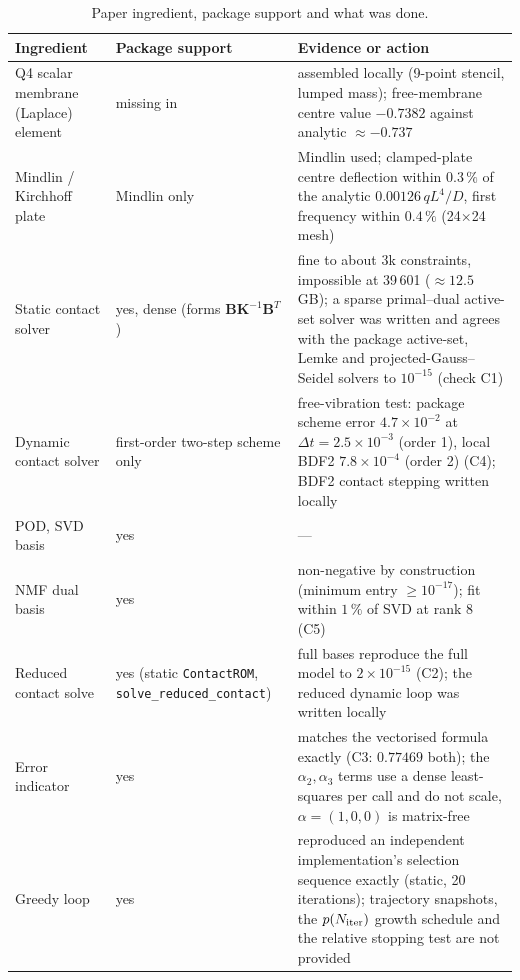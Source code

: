 \begin{table}[tbp]
\centering\footnotesize
\caption{Paper ingredient, package support and what was done.}\label{tab:vf-bl-cap}
\begin{tabularx}{\linewidth}{@{}>{\raggedright\arraybackslash}p{3.3cm} >{\raggedright\arraybackslash}p{3.2cm} >{\raggedright\arraybackslash}X@{}}
\toprule
Ingredient & Package support & Evidence or action\\
\midrule
Q4 scalar membrane (Laplace) element & missing in \fea{} & assembled locally (9-point stencil, lumped mass); free-membrane centre value $-0.7382$ against analytic $\approx-0.737$\\
Mindlin / Kirchhoff plate & Mindlin only & Mindlin used; clamped-plate centre deflection within $0.3\,\%$ of the analytic $0.00126\,qL^4/D$, first frequency within $0.4\,\%$ (24$\times$24 mesh)\\
Static contact solver & yes, dense (forms $\mathbf B\mathbf K^{-1}\mathbf B^{T}$) & fine to about 3k constraints, impossible at 39\,601 ($\approx12.5$ GB); a sparse primal--dual active-set solver was written and agrees with the package active-set, Lemke and projected-Gauss--Seidel solvers to $10^{-15}$ (check C1)\\
Dynamic contact solver & first-order two-step scheme only & free-vibration test: package scheme error $4.7\times10^{-2}$ at $\Delta t=2.5\times10^{-3}$ (order 1), local BDF2 $7.8\times10^{-4}$ (order 2) (C4); BDF2 contact stepping written locally\\
POD, SVD basis & yes & ---\\
NMF dual basis & yes & non-negative by construction (minimum entry $\ge10^{-17}$); fit within $1\,\%$ of SVD at rank 8 (C5)\\
Reduced contact solve & yes (static \texttt{ContactROM}, \texttt{solve\_reduced\_contact}) & full bases reproduce the full model to $2\times10^{-15}$ (C2); the reduced dynamic loop was written locally\\
Error indicator & yes & matches the vectorised formula exactly (C3: $0.77469$ both); the $\alpha_2,\alpha_3$ terms use a dense least-squares per call and do not scale, $\alpha=(1,0,0)$ is matrix-free\\
Greedy loop & yes & reproduced an independent implementation's selection sequence exactly (static, 20 iterations); trajectory snapshots, the $p(N_{\rm iter})$ growth schedule and the relative stopping test are not provided\\
\bottomrule
\end{tabularx}
\end{table}

